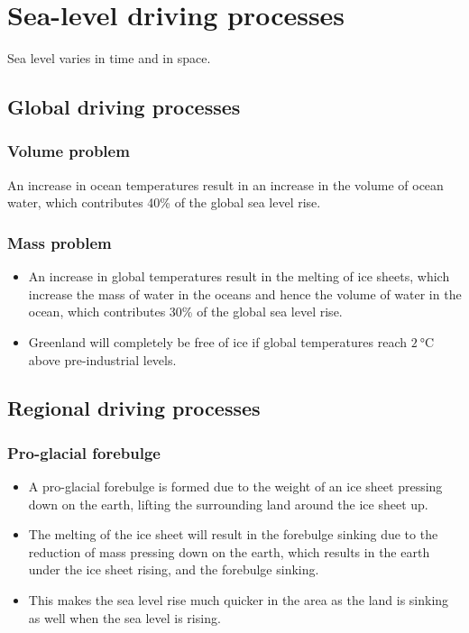 \documentclass[11pt]{article}
\begin{document}
\section{Sea-level driving processes}
\label{sec:orgd5a4e3f}
Sea level varies in time and in space.
\subsection{Global driving processes}
\label{sec:orgc93edf9}

\subsubsection{Volume problem}
\label{sec:org72fd0b4}
An increase in ocean temperatures result in an increase in the volume of ocean water, which contributes 40\% of the global sea level rise.
\subsubsection{Mass problem}
\label{sec:orgbe88cbb}
\begin{itemize}
\item An increase in global temperatures result in the melting of ice sheets, which increase the mass of water in the oceans and hence the volume of water in the ocean, which contributes 30\% of the global sea level rise.
\item Greenland will completely be free of ice if global temperatures reach \(\qty{2}{\degreeCelsius}\) above pre-industrial levels.
\end{itemize}
\subsection{Regional driving processes}
\label{sec:orgae74e94}

\subsubsection{Pro-glacial forebulge}
\label{sec:orgd51c348}
\begin{itemize}
\item A pro-glacial forebulge is formed due to the weight of an ice sheet pressing down on the earth, lifting the surrounding land around the ice sheet up.
\item The melting of the ice sheet will result in the forebulge sinking due to the reduction of mass pressing down on the earth, which results in the earth under the ice sheet rising, and the forebulge sinking.
\item This makes the sea level rise much quicker in the area as the land is sinking as well when the sea level is rising.
\end{itemize}
\end{document}
